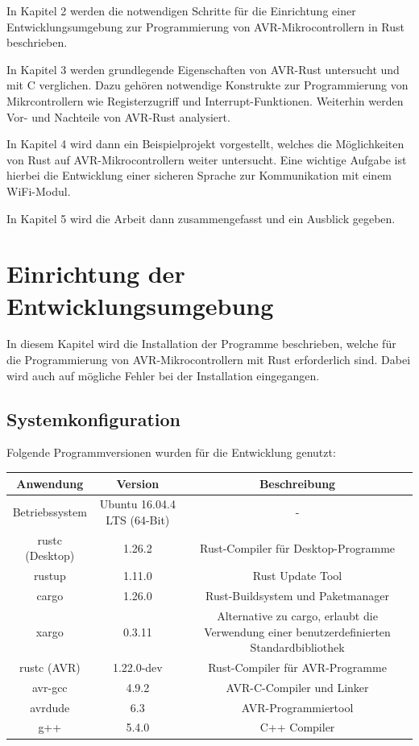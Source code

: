 \documentclass
[ 12pt,
  parskip=half %
]{scrreprt}
\begin{document}
In Kapitel 2 werden die notwendigen Schritte für die Einrichtung einer Entwicklungsumgebung zur Programmierung von AVR-Mikrocontrollern in Rust beschrieben.

In Kapitel 3 werden grundlegende Eigenschaften von AVR-Rust untersucht und mit C verglichen. Dazu gehören notwendige Konstrukte zur Programmierung von Mikrcontrollern wie Registerzugriff und Interrupt-Funktionen. Weiterhin werden Vor- und Nachteile von AVR-Rust analysiert.

In Kapitel 4 wird dann ein Beispielprojekt vorgestellt, welches die Möglichkeiten von Rust auf AVR-Mikrocontrollern weiter untersucht. Eine wichtige Aufgabe ist hierbei die Entwicklung einer sicheren Sprache zur Kommunikation mit einem WiFi-Modul.

In Kapitel 5 wird die Arbeit dann zusammengefasst und ein Ausblick gegeben.

\chapter{Einrichtung der Entwicklungsumgebung}
\label{sec:Einrichtung-der-Entwicklungsumgebung}

In diesem Kapitel wird die Installation der Programme beschrieben, welche für die Programmierung von AVR-Mikrocontrollern mit Rust erforderlich sind. Dabei wird auch auf mögliche Fehler bei der Installation eingegangen.
 
\section{Systemkonfiguration}

Folgende Programmversionen wurden für die Entwicklung genutzt:
\begin{center}
	\begin{tabulary}{\columnwidth}{|C|C|C|}
		\hline
		\textbf{Anwendung} & \textbf{Version} & \textbf{Beschreibung}\\
		\hline
		Betriebssystem & Ubuntu 16.04.4 LTS (64-Bit) & -\\
		\hline
		rustc (Desktop) & 1.26.2 & Rust-Compiler für Desktop-Programme\\
		\hline
		rustup & 1.11.0 & Rust Update Tool\\
		\hline
		cargo & 1.26.0 & Rust-Buildsystem und Paketmanager\\
		\hline
		xargo & 0.3.11 & Alternative zu cargo, erlaubt die Verwendung einer benutzerdefinierten Standardbibliothek \\
		\hline
		rustc (AVR) & 1.22.0-dev & Rust-Compiler für AVR-Programme\\
		\hline
		avr-gcc & 4.9.2 & AVR-C-Compiler und Linker\\
		\hline
		avrdude & 6.3 & AVR-Programmiertool\\
		\hline
		g++ & 5.4.0 & C++ Compiler\\
		\hline
	\end{tabulary}
\end{center}
\end{document}
